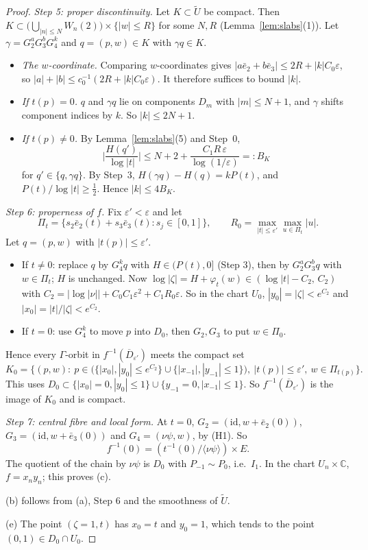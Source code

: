 \documentclass{article}
\theoremstyle{definition}
\theoremstyle{plain}
\newcommand{\C}{\mathbb{C}}
\newcommand{\eb}{\bar e}
\newcommand{\Ut}{\widetilde{U}}
\begin{document}
\begin{proof}
\emph{Step 5: proper discontinuity.} Let $K\subset\Ut$ be compact. Then
$K\subset\big(\bigcup_{|n|\le N}W_n(2)\big)\times\{|w|\le R\}$ for some $N,R$
(Lemma~\ref{lem:slabs}(1)). Let $\gamma=G_2^aG_3^bG_4^k$ and $q=(p,w)\in K$ with
$\gamma q\in K$.
\begin{itemize}
\item \emph{The $w$-coordinate.} Comparing $w$-coordinates gives
  $|a\eb_2+b\eb_3|\le 2R+|k|C_0\varepsilon$, so
  $|a|+|b|\le c_0^{-1}(2R+|k|C_0\varepsilon)$. It therefore suffices to bound $|k|$.
\item \emph{If $t(p)=0$.} $q$ and $\gamma q$ lie on components $D_m$ with $|m|\le N+1$,
  and $\gamma$ shifts component indices by $k$. So $|k|\le 2N+1$.
\item \emph{If $t(p)\neq0$.} By Lemma~\ref{lem:slabs}(5) and Step~0,
  \[\Big|\frac{H(q')}{\log|t|}\Big|\le N+2+\frac{C_1R\,\varepsilon}{\log(1/\varepsilon)}=:B_K\]
  for $q'\in\{q,\gamma q\}$. By Step~3, $H(\gamma q)-H(q)=kP(t)$, and
  $P(t)/\log|t|\ge\tfrac12$. Hence $|k|\le 4B_K$.
\end{itemize}

\emph{Step 6: properness of $f$.} Fix $\varepsilon'<\varepsilon$ and let
\[\Pi_t=\{s_2\eb_2(t)+s_3\eb_3(t):s_j\in[0,1]\},\qquad R_0=\max_{|t|\le\varepsilon'}\max_{u\in\Pi_t}|u|.\]
Let $q=(p,w)$ with $|t(p)|\le\varepsilon'$.
\begin{itemize}
\item If $t\neq0$: replace $q$ by $G_4^kq$ with $H\in(P(t),0]$ (Step 3), then by
  $G_2^aG_3^bq$ with $w\in\Pi_t$; $H$ is unchanged. Now
  $\log|\zeta|=H+\varphi_t(w)\in(\log|t|-C_2,\,C_2)$ with
  $C_2=|\log|\nu||+C_0C_1\varepsilon^2+C_1R_0\varepsilon$. So in the chart $U_0$,
  $|y_0|=|\zeta|<e^{C_2}$ and $|x_0|=|t|/|\zeta|<e^{C_2}$.
\item If $t=0$: use $G_4^k$ to move $p$ into $D_0$, then $G_2,G_3$ to put
  $w\in\Pi_0$.
\end{itemize}
Hence every $\Gamma$-orbit in $f^{-1}(\overline{D}_{\varepsilon'})$ meets the compact set
\[K_0=\Big\{(p,w):\ p\in\big(\{|x_0|,|y_0|\le e^{C_2}\}\cup\{|x_{-1}|,|y_{-1}|\le1\}\big),\
|t(p)|\le\varepsilon',\ w\in\Pi_{t(p)}\Big\}.\]
This uses $D_0\subset\{|x_0|=0,|y_0|\le1\}\cup\{y_{-1}=0,|x_{-1}|\le1\}$. So
$f^{-1}(\overline D_{\varepsilon'})$ is the image of $K_0$ and is compact.

\emph{Step 7: central fibre and local form.} At $t=0$, $G_2=(\mathrm{id},w+\eb_2(0))$,
$G_3=(\mathrm{id},w+\eb_3(0))$ and $G_4=(\nu\psi,w)$, by (H1). So
\[f^{-1}(0)=(t^{-1}(0)/\langle \nu\psi\rangle)\times E.\]
The quotient of the chain by $\nu\psi$ is $D_0$ with $P_{-1}\sim P_0$, i.e.\ $I_1$. In
the chart $U_n\times\C$, $f=x_ny_n$; this proves (c).

(b) follows from (a), Step 6 and the smoothness of $\Ut$.

(e) The point $(\zeta=1,t)$ has $x_0=t$ and $y_0=1$, which tends to the point
$(0,1)\in D_0\cap U_0$.
\end{proof}
\end{document}
